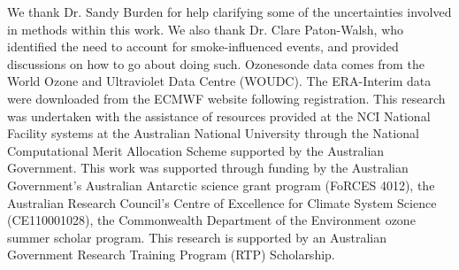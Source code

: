   We thank Dr. Sandy Burden for help clarifying some of the uncertainties involved in methods within this work.
  We also thank Dr. Clare Paton-Walsh, who identified the need to account for smoke-influenced events, and provided discussions on how to go about doing such.
  Ozonesonde data comes from the World Ozone and Ultraviolet Data Centre (WOUDC).
  The ERA-Interim data were downloaded from the ECMWF website following registration.
  This research was undertaken with the assistance of resources provided at the NCI National Facility systems at the Australian National University through the National Computational Merit Allocation Scheme supported by the Australian Government.
  This work was supported through funding by the Australian Government's Australian Antarctic science grant program (FoRCES 4012), the Australian Research Council's Centre of Excellence for Climate System Science (CE110001028), the Commonwealth Department of the Environment ozone summer scholar program.
  This research is supported by an Australian Government Research Training Program (RTP) Scholarship.
